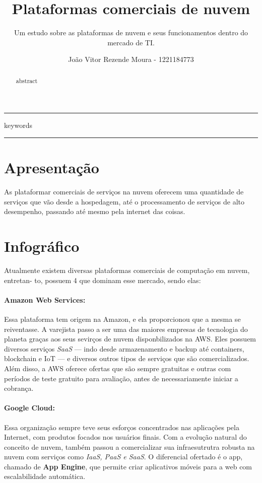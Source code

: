 \documentclass[12pt, a4paper]{paper}
\title{Plataformas comerciais de nuvem\\
  \hfill%
}
\subtitle{Um estudo sobre as plataformas de nuvem e seus funcionamentos dentro do mercado de TI.}
\author{João Vitor Rezende Moura - 1221184773}
\begin{document}
\maketitle

\hrule
\begin{abstract}
  abstract
\end{abstract}
\vspace{-0.6cm} %
\begin{keywords}
  keywords
\end{keywords}
\hrule

\section{Apresentação} %
\label{sec:Apresentação}
As plataformar comerciais de serviços na nuvem oferecem uma quantidade de serviços 
que vão desde a hospedagem, até o processamento de serviços de alto desempenho, 
passando até mesmo pela internet das coisas.

\section{Infográfico} %
\label{sec:Infográfico}
Atualmente existem diversas plataformas comerciais de computação em nuvem, entretan- 
to, possuem 4 que dominam esse mercado, sendo elas:

\paragraph{Amazon Web Services:} %
\label{par:Amazon Web Services:}
Essa plataforma tem origem na Amazon, e ela proporcionou que a mesma se reiventasse. 
A varejista passo a ser uma das maiores empresas de tecnologia do planeta 
graças aos seus sevirços de nuvem disponbilizados na AWS. 
Eles possuem diversos serviços \textit{SaaS} --- indo desde armazenamento e backup até 
containers, blockchain e IoT --- e diversos outros tipos de serviços que são 
comercializados. Além disso, a AWS oferece ofertas que são sempre gratuitas e outras 
com períodos de teste gratuito para avaliação, antes de necessariamente iniciar a 
cobrança. 

\paragraph{Google Cloud:} %
\label{par:Google Cloud:}
Essa organização sempre teve seus esforços concentrados nas aplicações pela Internet, com produtos focados nos usuários finais. Com a evolução natural do conceito de nuvem, também passou a comercializar sua infraesutrutra robusta na nuvem com serviços como \textit{IaaS, PaaS e SaaS}. 
O diferencial ofertado é o app, chamado de \textbf{App Engine}, que permite criar 
aplicativos móveis para a web com escalabilidade automática.
\end{document}
